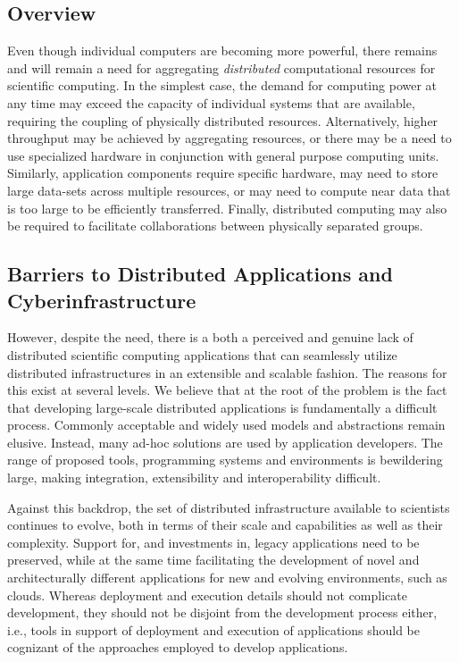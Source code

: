 \documentclass[a4paper,10pt]{article}
\begin{document}
\subsection{Overview}


Even though individual computers are becoming more powerful, there
remains and will remain a need for aggregating {\em distributed}
computational resources for scientific computing. In the simplest
case, the demand for computing power at any time may exceed
the capacity of individual systems that are available, requiring the coupling
of physically distributed resources.  Alternatively, higher throughput
may be achieved by aggregating resources, or there may be a need to use
specialized hardware in conjunction with general purpose computing
units.  Similarly, application components require specific hardware,
may need to store large data-sets across multiple resources, or may need to
compute near data that is too large to be efficiently transferred.  Finally,
distributed computing may also be required to facilitate collaborations
between physically separated groups.

\subsection{Barriers to Distributed Applications and
  Cyberinfrastructure}

However, despite the need, there is a both a perceived and genuine
lack of distributed scientific computing applications that can
seamlessly utilize distributed infrastructures in an extensible and
scalable fashion.  The reasons for this exist at several levels.  We
believe that at the root of the problem is the fact that developing
large-scale distributed applications is fundamentally a difficult
process.  Commonly acceptable and widely used models and abstractions
remain elusive. Instead, many ad-hoc solutions are used by application
developers.  The range of proposed tools, programming systems and
environments is bewildering large, making integration, extensibility
and interoperability difficult.

Against this backdrop, the set of distributed infrastructure available
to scientists continues to evolve, both in terms of their scale and
capabilities as well as their complexity.  Support for, and
investments in, legacy applications need to be preserved, while at the
same time facilitating the development of novel and architecturally
different applications for new and evolving environments, such as
clouds. Whereas deployment and execution details should not complicate
development, they should not be disjoint from the development process
either, i.e., tools in support of deployment and execution of
applications should be cognizant of the approaches employed to develop
applications.
\end{document}
